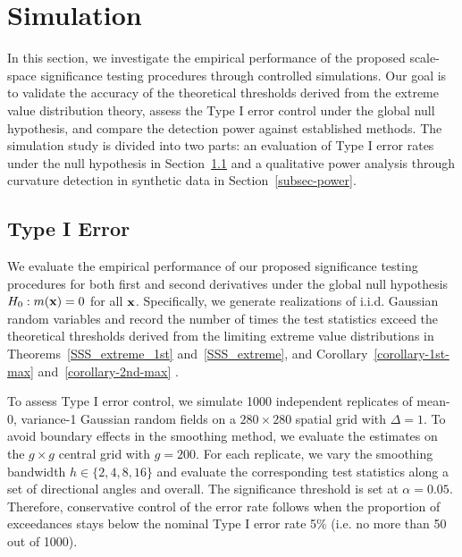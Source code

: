 \documentclass{article}
\begin{document}
\section{Simulation}
\label{sec_simulation}
In this section, we investigate the empirical performance of the proposed scale-space significance testing procedures through controlled simulations. Our goal is to validate the accuracy of the theoretical thresholds derived from the extreme value distribution theory, assess the Type I error control under the global null hypothesis, and compare the detection power against established methods. %
The simulation study is divided into two parts: an evaluation of Type I error rates under the null hypothesis in Section~\ref{subsec-type1} and a qualitative power analysis through curvature detection in synthetic data in Section~\ref{subsec-power}.

\subsection{Type I Error}
\label{subsec-type1}
We evaluate the empirical performance of our proposed significance testing procedures for both first and second derivatives under the global null hypothesis $H_0: m({\bf x})=0$ for all ${\bf x}$. Specifically, we generate realizations of i.i.d.  Gaussian random variables and record the number of times the test statistics exceed the theoretical thresholds derived from the limiting extreme value distributions in Theorems~\ref{SSS_extreme_1st} and~\ref{SSS_extreme}, and Corollary~\ref{corollary-1st-max} and~\ref{corollary-2nd-max} .

To assess Type I error control, we simulate 1000 independent replicates of mean-0, variance-1 Gaussian random fields on a $280 \times 280$ spatial grid with $\Delta = 1$. To avoid boundary effects in the smoothing method, we evaluate the estimates on the  $g\times g$ central grid with $g=200$.  For each replicate, we vary the smoothing bandwidth $h \in \{2, 4, 8, 16\}$ and evaluate the corresponding test statistics along a set of directional angles and overall. The significance threshold is set at $\alpha = 0.05$. Therefore, conservative control of the error rate follows when  the proportion of exceedances stays below the nominal Type I error rate 5\% (i.e. no more than 50 out of 1000).
\end{document}
